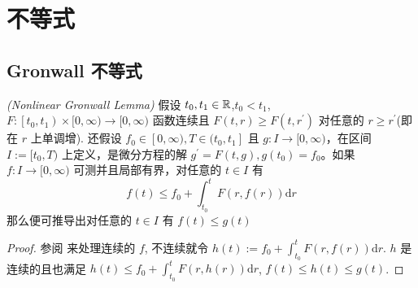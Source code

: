 \chapter{不等式}
\label{cha:inequalities}

\section{Gronwall 不等式}
\label{sec:Gronwall}


\begin{lemma}\textit{(Nonlinear Gronwall Lemma)}
  \label{lem:nonlinear-Gronwall}
  假设 $t_{0}, t_{1} \in {\mathbb{R}}$,$ t_{0}<t_{1}$, $F:\left[t_{0}, t_{1} \right) \times[0, \infty)\rightarrow[0, \infty)$ 函数连续且 $F(t, r) \geqslant F\left(t, r^{\prime}\right)$ 对任意的 $r \geqslant r^{\prime}$(即在 $r$ 上单调增). 还假设 $f_{0} \in [0, \infty), T \in (t_{0}, t_{1}]$ 且 $g: I \rightarrow [0, \infty)$，在区间 $I:=[t_{0}, T) $ 上定义，是微分方程的解 $g^{\prime}=F(t, g), g\left(t_{0}\right)=f_{0}$。如果 $f: I \rightarrow[0, \infty)$ 可测并且局部有界，对任意的 $t \in I$ 有
\[
f(t) \leqslant f_{0}+\int_{t_{0}}^{t} F(r, f(r)) \mathrm{d} r
\]
那么便可推导出对任意的 $t \in I$ 有 $f(t) \leqslant g(t)$ 
\end{lemma}

\begin{proof}
  参阅 \cite[theorem 4.1]{Beesack1975Gronwall} 来处理连续的 $f$, 不连续就令 $h(t):=f_{0}+\int_{t_{0}}^{t} F(r, f(r)) \mathrm{d} r $. $h$ 是连续的且也满足 $h(t) \leqslant f_{0}+\int_{t_{0}}^{t} F(r, h(r)) \mathrm{d} r$, $f(t) \leqslant h(t) \leqslant g(t)$.
\end{proof}


